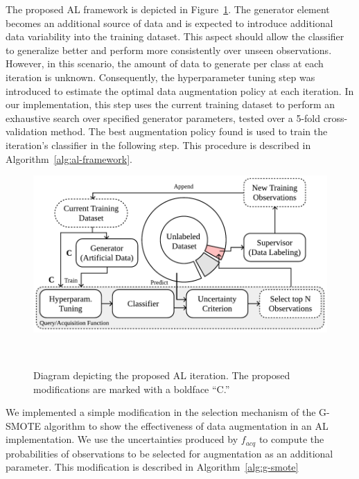 The proposed AL framework is depicted in Figure~\ref{fig:al_proposed}.
The generator element becomes an additional source of data and is expected to
introduce additional data variability into the training dataset. This
aspect should allow the classifier to generalize better and perform more
consistently over unseen observations. However, in this scenario, the amount
of data to generate per class at each iteration is unknown. Consequently, the
hyperparameter tuning step was introduced to estimate the optimal data
augmentation policy at each iteration. In our implementation, this step uses
the current training dataset to perform an exhaustive search over specified
generator parameters, tested over a 5-fold cross-validation
method. The best augmentation policy found is used to train the iteration's
classifier in the following step. This procedure is described in
Algorithm~\ref{alg:al-framework}.


\begin{figure}
	\centering
	\includegraphics[width=.75\linewidth]{al_proposed}
    \caption[Diagram depicting the proposed AL iteration.]{%
        Diagram depicting the proposed AL iteration. The proposed
        modifications are marked with a boldface ``C.''
    }~\label{fig:al_proposed}
\end{figure}

We implemented a simple modification in the selection mechanism of the
G-SMOTE algorithm to show the effectiveness of data augmentation in an AL
implementation. We use the uncertainties produced by $f_{acq}$ to compute
the probabilities of observations to be selected for augmentation as an
additional parameter. This modification is described in
Algorithm~\ref{alg:g-smote} 


